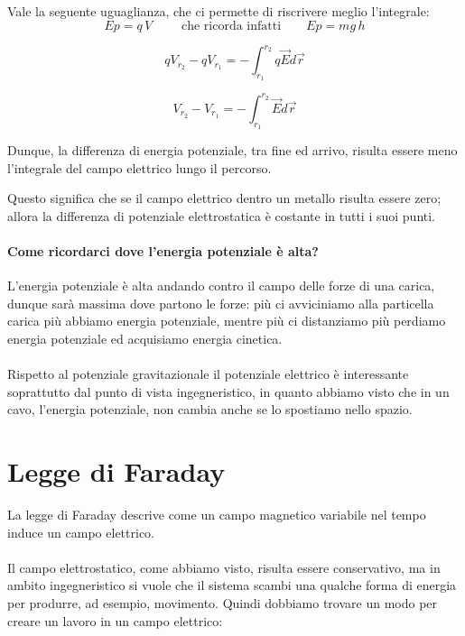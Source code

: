 Vale la seguente uguaglianza, che ci permette di riscrivere meglio l'integrale:
\begin{equation*}
    Ep = q\,V \qquad \text{ che ricorda infatti}\qquad Ep = mg\,h
\end{equation*}

\begin{equation*}
    qV_{r_2} - qV_{r_1} = -\int_{r_1}^{r_2} q\vec{E}d\vec{r}
\end{equation*}

\begin{equation}
    V_{r_2} - V_{r_1} = -\int_{r_1}^{r_2}\vec{E}d\vec{r}
\end{equation}

Dunque, la differenza di energia potenziale, tra fine ed arrivo, risulta essere meno l'integrale del campo elettrico lungo il percorso.

Questo significa che se il campo elettrico dentro un metallo risulta essere zero; allora la differenza di potenziale elettrostatica è costante in tutti i suoi punti.
\paragraph{Come ricordarci dove l'energia potenziale è alta?\\}

L'energia potenziale è alta andando contro il campo delle forze di una carica, dunque sarà massima dove partono le forze: più ci avviciniamo alla particella carica più abbiamo energia potenziale, mentre più ci distanziamo più perdiamo energia potenziale ed acquisiamo energia cinetica.

\paragraph{}
Rispetto al potenziale gravitazionale il potenziale elettrico è interessante soprattutto dal punto di vista ingegneristico, in quanto abbiamo visto che in un cavo, l'energia potenziale, non cambia anche se lo spostiamo nello spazio.

\newpage
\section{Legge di Faraday}

La legge di Faraday descrive come un campo magnetico variabile nel tempo induce un campo elettrico.
\paragraph{}
Il campo elettrostatico, come abbiamo visto, risulta essere conservativo, ma in ambito ingegneristico si vuole che il sistema scambi una qualche forma di energia per produrre, ad esempio, movimento. 
Quindi dobbiamo trovare un modo per creare un lavoro in un campo elettrico: 
